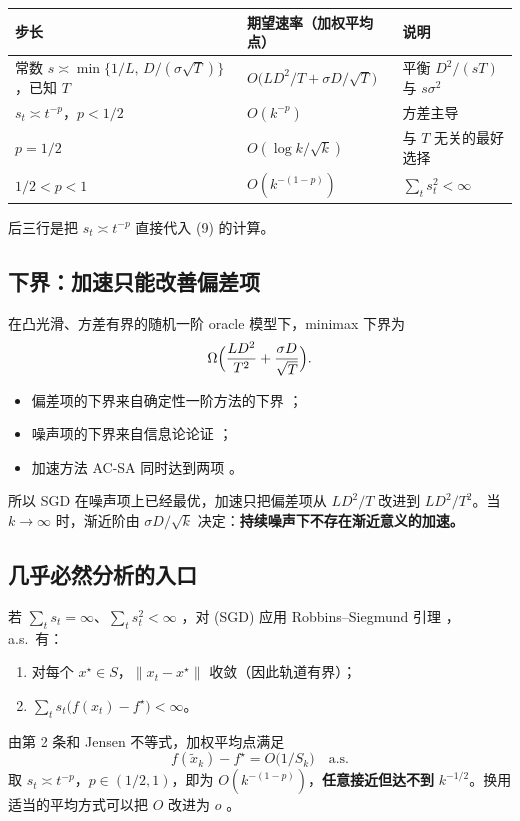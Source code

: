 \documentclass[11pt]{ctexart}
\begin{document}
\begin{center}
\begin{tabularx}{\linewidth}{@{}>{\raggedright\arraybackslash}X l >{\raggedright\arraybackslash}X@{}}
\toprule
步长 & 期望速率（加权平均点） & 说明 \\
\midrule
常数 $s\asymp\min\{1/L,\,D/(\sigma\sqrt T)\}$，已知 $T$ & $O\bigl(LD^2/T+\sigma D/\sqrt T\bigr)$ & 平衡 $D^2/(sT)$ 与 $s\sigma^2$ \citep{nemirovski2009} \\
$s_t\asymp t^{-p}$，$p<1/2$ & $O(k^{-p})$ & 方差主导 \\
$p=1/2$ & $O(\log k/\sqrt k)$ & 与 $T$ 无关的最好选择 \\
$1/2<p<1$ & $O(k^{-(1-p)})$ & $\sum_t s_t^2<\infty$ \citep{robbins1951} \\
\bottomrule
\end{tabularx}
\end{center}
后三行是把 $s_t\asymp t^{-p}$ 直接代入 (9) 的计算。

\subsection{下界：加速只能改善偏差项}

在凸光滑、方差有界的随机一阶 oracle 模型下，minimax 下界为
\[
\Omega\Bigl(\frac{LD^2}{T^2}+\frac{\sigma D}{\sqrt T}\Bigr).
\]
\begin{itemize}
  \item 偏差项的下界来自确定性一阶方法的下界 \citep[Theorem~2.1.7]{nesterov2004}；
  \item 噪声项的下界来自信息论论证 \citep{nemirovski1983,agarwal2012}；
  \item 加速方法 AC-SA 同时达到两项 \citep{lan2012}。
\end{itemize}
所以 SGD 在噪声项上已经最优，加速只把偏差项从 $LD^2/T$ 改进到 $LD^2/T^2$。当 $k\to\infty$ 时，渐近阶由 $\sigma D/\sqrt k$ 决定：\textbf{持续噪声下不存在渐近意义的加速。}

\subsection{几乎必然分析的入口}

若 $\sum_t s_t=\infty$、$\sum_t s_t^2<\infty$ \citep{robbins1951}，对 (SGD) 应用 Robbins--Siegmund 引理 \citep{robbins1971}，a.s.\ 有：
\begin{enumerate}
  \item 对每个 $x^\star\in S$，$\|x_t-x^\star\|$ 收敛（因此轨道有界）；
  \item $\sum_t s_t\bigl(f(x_t)-f^\star\bigr)<\infty$。
\end{enumerate}
由第 2 条和 Jensen 不等式，加权平均点满足
\[
f(\widetilde x_k)-f^\star=O\bigl(1/S_k\bigr)\quad\text{a.s.}
\]
取 $s_t\asymp t^{-p}$，$p\in(1/2,1)$，即为 $O(k^{-(1-p)})$，\textbf{任意接近但达不到} $k^{-1/2}$。换用适当的平均方式可以把 $O$ 改进为 $o$ \citep{sebbouh2021}。
\end{document}
